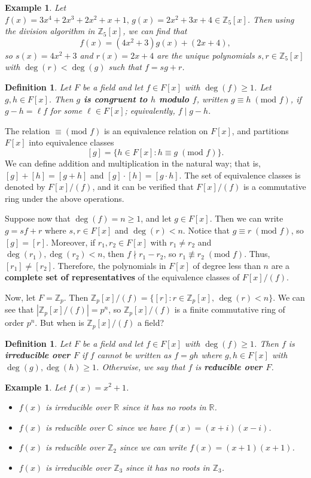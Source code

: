 \documentclass[10pt]{article}
\newcommand{\R}{\mathbb{R}}
\newcommand{\C}{\mathbb{C}}
\newcommand{\Z}{\mathbb{Z}}
\theoremstyle{newstyle}
\newtheorem{defn}[thm]{Definition}
\newtheorem{exmp}[thm]{Example}
\begin{document}
\begin{exmp}
Let $f(x) = 3x^4 + 2x^3 + 2x^2 + x + 1,\, g(x) = 2x^2 + 3x+ 4 \in \Z_5[x]$. 
Then using the division algorithm in $\Z_5[x]$, we can find that 
\[ f(x) = (4x^2 + 3) g(x) + (2x+4), \]
so $s(x) = 4x^2 + 3$ and $r(x) = 2x+4$ are the unique polynomials $s, r \in 
\Z_5[x]$ with $\deg(r) < \deg(g)$ such that $f=sg+r$. 
\end{exmp}

\begin{defn}
Let $F$ be a field and let $f \in F[x]$ with $\deg(f) \geq 1$. Let 
$g, h \in F[x]$. Then {\bf $g$ is congruent to $h$ modulo $f$}, written 
$g \equiv h \; (\text{mod } f)$, if $g-h = \ell f$ for some $\ell \in F[x]$; 
equivalently, $f \mid g-h$. 
\end{defn}

The relation $\equiv (\text{mod } f)$ is an equivalence relation on $F[x]$, and 
partitions $F[x]$ into equivalence classes 
\[ [g] = \{h \in F[x] : h \equiv g \;(\text{mod } f)\}. \]
We can define addition and multiplication in the natural way; that is, 
$[g] + [h] = [g+h]$ and $[g] \cdot [h] = [g \cdot h]$. The set of equivalence classes is denoted by 
$F[x]/(f)$, and it can be verified that $F[x]/(f)$ is a commutative ring under the above operations.

Suppose now that $\deg(f) = n \geq 1$, and let $g \in F[x]$. Then we can write $g = sf+r$ where 
$s, r \in F[x]$ and $\deg(r) < n$. Notice that $g \equiv r \; (\text{mod } f)$, so 
$[g] = [r]$. Moreover, if $r_1, r_2 \in F[x]$ with $r_1 \neq r_2$ and $\deg(r_1), \deg(r_2) < n$, 
then $f \nmid r_1 - r_2$, so $r_1 \not\equiv r_2 \; (\text{mod } f)$. Thus, 
$[r_1] \neq [r_2]$. Therefore, the polynomials in $F[x]$ of degree less than $n$ are a 
{\bf complete set of representatives} of the equivalence classes of $F[x]/(f)$.

Now, let $F = \Z_p$. Then $\Z_p[x]/(f) = \{[r] : r \in \Z_p[x],\, \deg(r) < n\}$. 
We can see that $|\Z_p[x]/(f)| = p^n$, so $\Z_p[x]/(f)$ is a finite commutative ring of 
order $p^n$. But when is $\Z_p[x]/(f)$ a field?

\begin{defn}
Let $F$ be a field and let $f \in F[x]$ with $\deg(f) \geq 1$. Then 
$f$ is {\bf irreducible over $F$} if $f$ cannot be written as $f = gh$ where 
$g, h \in F[x]$ with $\deg(g), \deg(h) \geq 1$. Otherwise, we say that $f$ 
is {\bf reducible over $F$}.
\end{defn}

\begin{exmp}
Let $f(x) = x^2 + 1$.
\begin{itemize}
    \item $f(x)$ is irreducible over $\R$ since it has no roots in $\R$. 
    \item $f(x)$ is reducible over $\C$ since we have $f(x) = (x+i)(x-i)$. 
    \item $f(x)$ is reducible over $\Z_2$ since we can write $f(x) = (x+1)(x+1)$.
    \item $f(x)$ is irreducible over $\Z_3$ since it has no roots in $\Z_3$.
\end{itemize}
\end{exmp}
\end{document}
